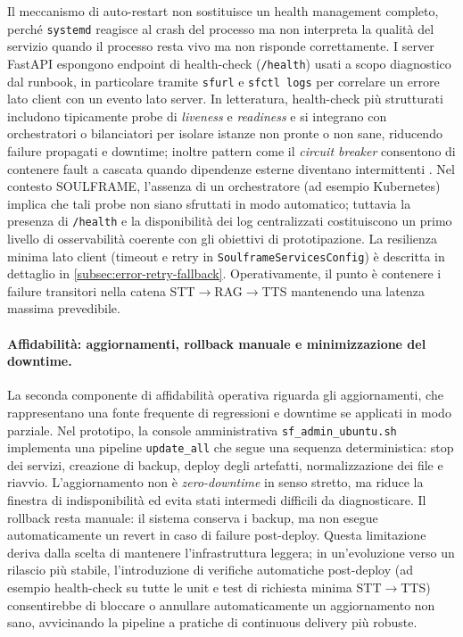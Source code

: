 Il meccanismo di auto-restart non sostituisce un health management completo, perché \texttt{systemd} reagisce al crash del processo ma non interpreta la qualità del servizio quando il processo resta vivo ma non risponde correttamente. I server FastAPI espongono endpoint di health-check (\texttt{/health}) usati a scopo diagnostico dal runbook, in particolare tramite \texttt{sfurl} e \texttt{sfctl logs} per correlare un errore lato client con un evento lato server. In letteratura, health-check più strutturati includono tipicamente probe di \emph{liveness} e \emph{readiness} e si integrano con orchestratori o bilanciatori per isolare istanze non pronte o non sane, riducendo failure propagati e downtime; inoltre pattern come il \emph{circuit breaker} consentono di contenere fault a cascata quando dipendenze esterne diventano intermittenti \cite{Barua2024FaultTolerance}. Nel contesto SOULFRAME, l'assenza di un orchestratore (ad esempio Kubernetes) implica che tali probe non siano sfruttati in modo automatico; tuttavia la presenza di \texttt{/health} e la disponibilità dei log centralizzati costituiscono un primo livello di osservabilità coerente con gli obiettivi di prototipazione. La resilienza minima lato client (timeout e retry in \texttt{SoulframeServicesConfig}) è descritta in dettaglio in \autoref{subsec:error-retry-fallback}. Operativamente, il punto è contenere i failure transitori nella catena STT$\rightarrow$RAG$\rightarrow$TTS mantenendo una latenza massima prevedibile.

\paragraph{Affidabilità: aggiornamenti, rollback manuale e minimizzazione del downtime.}
La seconda componente di affidabilità operativa riguarda gli aggiornamenti, che rappresentano una fonte frequente di regressioni e downtime se applicati in modo parziale. Nel prototipo, la console amministrativa \texttt{sf\_admin\_ubuntu.sh} implementa una pipeline \texttt{update\_all} che segue una sequenza deterministica: stop dei servizi, creazione di backup, deploy degli artefatti, normalizzazione dei file e riavvio. L'aggiornamento non è \emph{zero-downtime} in senso stretto, ma riduce la finestra di indisponibilità ed evita stati intermedi difficili da diagnosticare. Il rollback resta manuale: il sistema conserva i backup, ma non esegue automaticamente un revert in caso di failure post-deploy. Questa limitazione deriva dalla scelta di mantenere l'infrastruttura leggera; in un'evoluzione verso un rilascio più stabile, l'introduzione di verifiche automatiche post-deploy (ad esempio health-check su tutte le unit e test di richiesta minima STT$\rightarrow$TTS) consentirebbe di bloccare o annullare automaticamente un aggiornamento non sano, avvicinando la pipeline a pratiche di continuous delivery più robuste.

